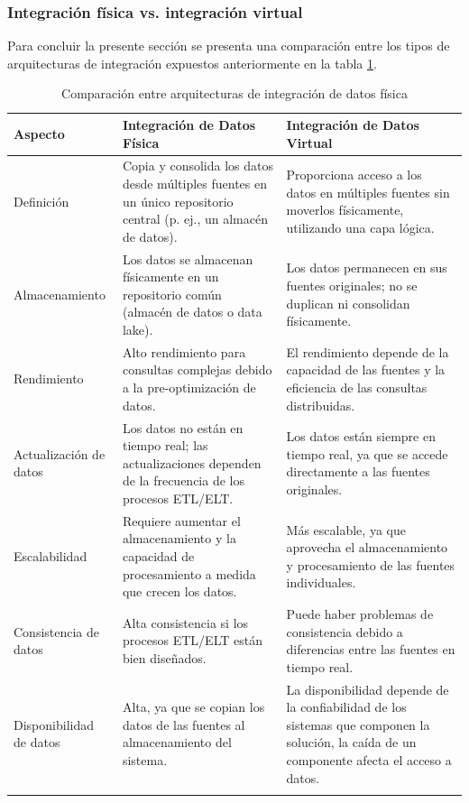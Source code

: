 \subsubsection{Integración física vs. integración virtual}

Para concluir la presente sección se presenta una comparación entre los tipos de arquitecturas de integración
expuestos anteriormente en la tabla \ref{tab:di-virtual-vs-physical-architectures}.

\begin{longtable}{|p{3cm}|p{4.5cm}|p{4.5cm}|}
    \hline
    \textbf{Aspecto} & \textbf{Integración de Datos Física} & \textbf{Integración de Datos Virtual} \\
    \hline
    Definición & Copia y consolida los datos desde múltiples fuentes en un único repositorio central (p. ej., un almacén de datos). & Proporciona acceso a los datos en múltiples fuentes sin moverlos físicamente, utilizando una capa lógica. \\
    \hline
    Almacenamiento & Los datos se almacenan físicamente en un repositorio común (almacén de datos o data lake). & Los datos permanecen en sus fuentes originales; no se duplican ni consolidan físicamente. \\
    \hline
    Rendimiento & Alto rendimiento para consultas complejas debido a la pre-optimización de datos. & El rendimiento depende de la capacidad de las fuentes y la eficiencia de las consultas distribuidas. \\
    \hline
    Actualización de datos & Los datos no están en tiempo real; las actualizaciones dependen de la frecuencia de los procesos ETL/ELT. & Los datos están siempre en tiempo real, ya que se accede directamente a las fuentes originales. \\
    \hline
    Escalabilidad & Requiere aumentar el almacenamiento y la capacidad de procesamiento a medida que crecen los datos. & Más escalable, ya que aprovecha el almacenamiento y procesamiento de las fuentes individuales. \\
    \hline
    Consistencia de datos & Alta consistencia si los procesos ETL/ELT están bien diseñados. & Puede haber problemas de consistencia debido a diferencias entre las fuentes en tiempo real. \\
    \hline
    Disponibilidad de datos & Alta, ya que se copian los datos de las fuentes al almacenamiento del sistema. & La disponibilidad depende de la confiabilidad de los sistemas que componen la solución, la caída de un componente afecta el acceso a datos.\\
    \hline 
    \caption{Comparación entre arquitecturas de integración de datos física}\label{tab:di-virtual-vs-physical-architectures}\\
    \end{longtable}




